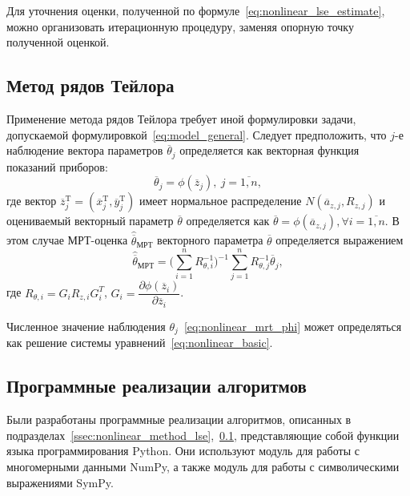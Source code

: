 Для уточнения оценки, полученной по формуле~\eqref{eq:nonlinear_lse_estimate}, можно
организовать итерационную процедуру, заменяя опорную точку полученной оценкой.

\vspace{2\baselineskip}
\subsection{Метод рядов Тейлора}\label{ssec:nonlinear_method_mrt}

Применение метода рядов Тейлора требует иной формулировки задачи,
допускаемой формулировкой~\eqref{eq:model_general}.
Следует предположить, что \( j \)-е наблюдение вектора параметров \( \overline{\theta}_j \)
определяется как векторная функция показаний приборов:
\begin{equation}
  \label{eq:nonlinear_mrt_phi}
  \overline{\theta}_j = \phi( \overline{z}_{j} ), \: j = \overline{1, n},
\end{equation}
где вектор
\( \overline{z}^{\text{T}}_{j} =
( \overline{x}^{\text{T}}_{j}, \overline{y}^{\text{T}}_{j}) \)
имеет нормальное распределение \( N(\overline{a}_{z,j}, R_{z,j}) \)
и оцениваемый векторный параметр \( \overline{\theta} \) определяется как
\( \overline{\theta} = \phi(\overline{a}_{z,j}), \forall i = \overline{1, n} \).
В этом случае МРТ-оценка \( \hat{\overline{\theta}}_{\text{МРТ}} \) векторного параметра \( \overline{\theta} \)
определяется выражением
\begin{equation*}
  \hat{\overline{\theta}}_{\text{МРТ}} =
  \Bigg( \sum^{n}_{i=1} R^{-1}_{\theta,i} \Bigg)^{-1}
  \sum^{n}_{j=1} R^{-1}_{\theta,j} \overline{\theta}_j,
\end{equation*}
где
\( R_{\theta,i} = G_i R_{z,i} G^T_i \),
\( G_i =
\dfrac{\partial \phi( \overline{z}_{i} ) }{ \partial \overline{z}_{i} } \).

Численное значение наблюдения \( \theta_j \)~\eqref{eq:nonlinear_mrt_phi} может определяться как
решение системы уравнений~\eqref{eq:nonlinear_basic}.

\vspace{2\baselineskip}
\subsection{Программные реализации алгоритмов}

Были разработаны программные реализации алгоритмов, описанных в
подразделах~\ref{ssec:nonlinear_method_lse},~\ref{ssec:nonlinear_method_mrt},
представляющие собой функции языка программирования Python.
Они используют модуль для работы с многомерными данными NumPy,
а также модуль для работы с символическими выражениями SymPy.

